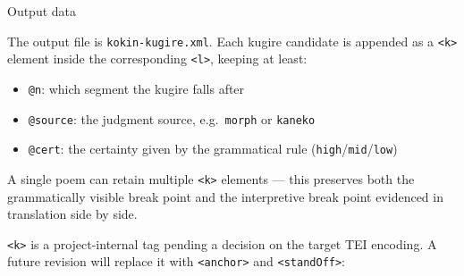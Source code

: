\begin{block}{Output data}

The output file is \texttt{kokin-kugire.xml}. Each kugire candidate is appended as
a \texttt{<k>} element inside the corresponding \texttt{<l>}, keeping at least:
\begin{itemize}
\item \texttt{@n}: which segment the kugire falls after
\item \texttt{@source}: the judgment source, e.g.\ \texttt{morph} or \texttt{kaneko}
\item \texttt{@cert}: the certainty given by the grammatical rule (\texttt{high}/\texttt{mid}/\texttt{low})
\end{itemize}

A single poem can retain multiple \texttt{<k>} elements --- this preserves both the
grammatically visible break point and the interpretive break point evidenced in
translation side by side.

\texttt{<k>} is a project-internal tag pending a decision on the target TEI encoding.
A future revision will replace it with \texttt{<anchor>} and \texttt{<standOff>}:



\end{block}
